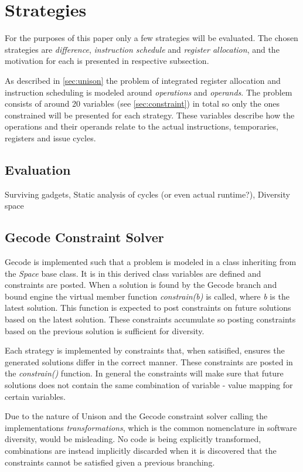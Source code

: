 \section{Strategies}

For the purposes of this paper only a few strategies will be evaluated. The chosen
strategies are \textit{difference}, \textit{instruction schedule} and
\textit{register allocation}, and the motivation for each is presented in respective
subsection.

As described in \ref{sec:unison} the problem of integrated register allocation and
instruction scheduling is modeled around \textit{operations} and \textit{operands}. The
problem consists of around 20 variables (see \ref{sec:constraint}) in total so only the
ones constrained will be presented for each strategy. These variables describe how the
operations and their operands relate to the actual instructions, temporaries, registers
and issue cycles.

\subsection{Evaluation}

Surviving gadgets,
Static analysis of cycles (or even actual runtime?),
Diversity space


\subsection{Gecode Constraint Solver}


Gecode is implemented such that a problem is modeled in a class inheriting from the
\textit{Space} base class. It is in this derived class variables are defined and constraints
are posted. When a solution is found by the Gecode branch and bound engine the virtual
member function \textit{constrain(b)} is called, where \textit{b} is the latest solution.
This function is expected to post constraints on future solutions based on the latest
solution. These constraints accumulate so posting constraints based on the previous solution
is sufficient for diversity.

Each strategy is implemented by constraints that, when satisified, ensures the
generated solutions differ in the correct manner. These constraints are posted in the
\textit{constrain()} function. In general the constraints will make sure that future
solutions does not contain the same combination of variable - value mapping for certain
variables.

Due to the nature of Unison and the Gecode constraint solver calling the implementations
\textit{transformations}, which is the common nomenclature in software diversity, would be
misleading. No code is being explicitly transformed, combinations are instead implicitly
discarded when it is discovered that the constraints cannot be satisfied given a previous
branching.


